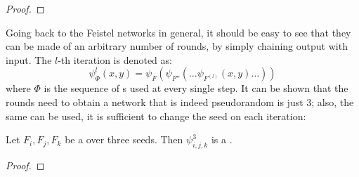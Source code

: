 \begin{proof}
\end{proof}

Going back to the Feistel networks in general, it should be easy to see that they can be made of an arbitrary number of rounds, by simply chaining output with input. The $l$-th iteration is denoted as: 
\[
    \psi^l_\Phi(x, y) = \psi_{F}(\psi_{F''}( \ldots \psi_{F^{(l)}}(x, y) \ldots ))
\]
where $\Phi$ is the sequence of \prf{}s used at every single step. It can be shown that the rounds need to obtain a network that is indeed pseudorandom is just 3; also, the same \prf{} can be used, it is sufficient to change the seed on each iteration\footnotemark:

\begin{theorem}
    Let $F_i, F_j, F_k$ be a \prf{} over three seeds. Then $\psi^3_{i, j, k}$ is a \prp.
\end{theorem}


\begin{proof}
\end{proof}

